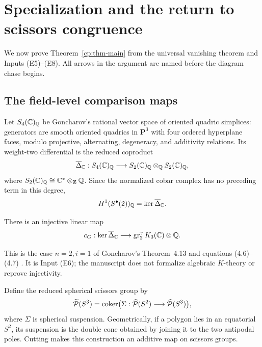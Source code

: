 \section{Specialization and the return to scissors congruence}
\label{cp:sec-specialization}

We now prove Theorem~\ref{cp:thm-main} from the universal vanishing theorem
and Inputs \textup{(E5)--(E8)}.  All arrows in the argument are named before
the diagram chase begins.

\subsection{The field-level comparison maps}

Let \(S_4(\mathbb C)_\mathbb Q\) be Goncharov's rational vector space of oriented
quadric simplices: generators are smooth oriented quadrics in
\(\mathbf P^3\) with four ordered hyperplane faces, modulo projective,
alternating, degeneracy, and additivity relations.  Its weight-two
differential is the reduced coproduct
\[
 \overline\Delta_\mathbb C:
 S_4(\mathbb C)_\mathbb Q\longrightarrow
 S_2(\mathbb C)_\mathbb Q\otimes_\mathbb Q S_2(\mathbb C)_\mathbb Q,
\]
where \(S_2(\mathbb C)_\mathbb Q\cong\mathbb C^*\otimes_{\mathbf Z}\mathbb Q\).  Since the normalized
cobar complex has no preceding term in this degree,
\begin{equation}
 H^1(S^\bullet(2))_\mathbb Q=\ker\overline\Delta_\mathbb C.
 \label{cp:eq-primitive-quadric-group}
\end{equation}

\begin{theorem}
\label{cp:thm-goncharov-weight-two}
There is an injective linear map
\begin{equation}
 c_G:\ker\overline\Delta_\mathbb C
 \longrightarrow \operatorname{gr}_2^\gamma K_3(\mathbb C)\otimes\mathbb Q.
 \label{cp:eq-goncharov-k3-map}
\end{equation}
\end{theorem}

This is the case \(n=2,i=1\) of Goncharov's Theorem~4.13 and equations
\textup{(4.6)--(4.7)} \cite{Goncharov1999}.  It is Input
\textup{(E6)}; the manuscript does not formalize algebraic \(K\)-theory or
reprove injectivity.

Define the reduced spherical scissors group by
\[
 \widetilde{\mathcal P}(S^3)=\operatorname{coker}
 \bigl(\Sigma:\widehat{\mathcal P}(S^2)\longrightarrow\widehat{\mathcal P}(S^3)\bigr),
\]
where \(\Sigma\) is spherical suspension.  Geometrically, if a polygon lies
in an equatorial \(S^2\), its suspension is the double cone obtained by
joining it to the two antipodal poles.  Cutting makes this construction an
additive map on scissors groups.

